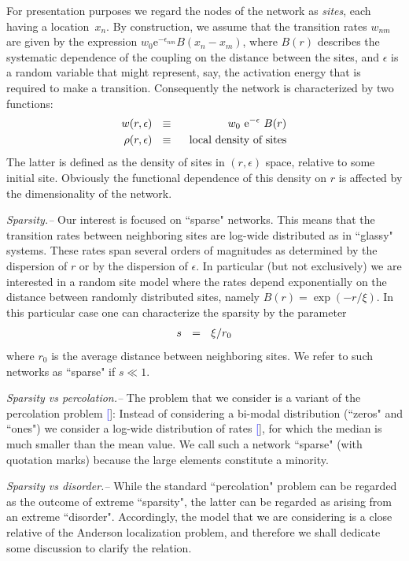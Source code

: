 \documentclass[aps,pre,floats,floatfix,twocolumn]{revtex4}
\newcommand{\eexp}{\mbox{e}^}
\newcommand{\mylabel}[1]{\label{#1}}
\newcommand{\eeq}{\end{eqnarray}}
\newcommand{\be}[1]{\begin{eqnarray}\ifthenelse{#1=-1}
{\nonumber}{\ifthenelse{#1=0}{}{\mylabel{e#1}}}}
\newcommand{\rmrk}[1]{#1}
\renewcommand{\cite}[1]{\textcolor{blue}{[\onlinecite{#1}}]} %
\begin{document}
For presentation purposes we regard the nodes 
of the network as {\em sites}, 
each having a location~$x_n$. 
By construction, we assume that the transition rates $w_{nm}$ 
are given by the expression ${w_0 \eexp{-\epsilon_{nm}} B(x_n{-}x_m)}$,  
where $B(r)$ describes the systematic dependence 
of the coupling on the distance between the sites, 
and $\epsilon$ is a random variable that might  
represent, say, the activation energy that is required 
to make a transition. \rmrk{Consequently the 
network is characterized by two functions:}
%
\be{4}
w(r,\epsilon) \ \ &\equiv& \ \ w_0 \ \eexp{-\epsilon} \ B(r) \\
\rho(r,\epsilon) \ \ &\equiv& \ \ \mbox{local density of sites}
\eeq
%
The latter is defined as the density 
of sites in $(r,\epsilon)$ space, 
relative to some initial site. 
Obviously the functional dependence 
of this density on $r$ is affected 
by the dimensionality of the network. 


{\em Sparsity.-- }
Our interest is focused on ``sparse" networks.
This means that the transition rates between 
neighboring sites are log-wide distributed    
as in ``glassy" systems. These rates span 
several orders of magnitudes as determined 
by the dispersion of $r$ 
or by the dispersion of $\epsilon$. 
%
In particular (but not exclusively) we are interested 
in a random site model where the rates depend exponentially 
on the distance between randomly distributed sites, 
namely ${B(r) = \exp(-r/\xi)}$. 
In this particular case one can characterize the 
sparsity by the parameter 
%
\be{101}
s \ \ = \ \ {\xi} / {r_0}
\eeq
%
where $r_0$ is the average distance between 
neighboring sites. We refer to such networks 
as ``sparse" if $s\ll1$.


{\em Sparsity vs percolation.-- }
The problem that we consider is a variant of the percolation problem \cite{aa0}:
Instead of considering a bi-modal distribution (``zeros" and ``ones")
we consider a log-wide distribution of rates \cite{Halp}, 
for which the median is much smaller than the mean value. 
We call such a network ``sparse" (with quotation marks) because 
the large elements constitute a minority.


{\em Sparsity vs disorder.-- }
While the standard  ``percolation" problem 
can be regarded as the outcome of extreme ``sparsity", 
the latter can be regarded as arising from an extreme ``disorder".  
Accordingly, the model that we are considering 
is a close relative of the Anderson localization 
problem, and therefore we shall dedicate 
some discussion to clarify the relation. 
\end{document}
